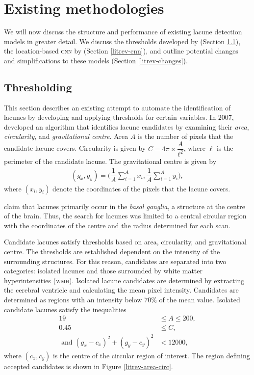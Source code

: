 %
%

\chapter{Existing methodologies}\label{litrev}

We will now discuss the structure and performance of existing lacune detection models in greater detail. We discuss the thresholds developed by \cite{Yokoyama2007} (Section \ref{litrev-threshold}), the location-based \textsc{cnn} by \cite{GhafoorianM.2017Dml3} (Section \ref{litrev-cnn}), and outline potential changes and simplifications to these models (Section \ref{litrev-changes}).

\section{Thresholding}\label{litrev-threshold}

This section describes an existing attempt to automate the identification of lacunes by developing and applying thresholds for certain variables. In 2007, \cite{Yokoyama2007} developed an algorithm that identifies lacune candidates by examining their \textit{area}, \textit{circularity}, and \textit{gravitational centre}. Area $A$ is the number of pixels that the candidate lacune covers. Circularity is given by $C = 4\pi\times\dfrac{A}{\ell^2}$, where $\ell$ is the perimeter of the candidate lacune. The gravitational centre is given by
\begin{align*}
	(g_x, g_y) = \bigg(\dfrac{1}{A}\sum_{i=1}^Ax_i, \dfrac{1}{A}\sum_{i=1}^Ay_i\bigg),
\end{align*}
where $(x_i, y_i)$ denote the coordinates of the pixels that the lacune covers.

\cite{Yokoyama2007} claim that lacunes primarily occur in the \textit{basal ganglia}, a structure at the centre of the brain. Thus, the search for lacunes was limited to a central circular region with the coordinates of the centre and the radius determined for each scan.

Candidate lacunes satisfy thresholds based on area, circularity, and gravitational centre. The thresholds are established dependent on the intensity of the surrounding structures. For this reason, candidates are separated into two categories: isolated lacunes and those surrounded by white matter hyperintensities (\textsc{wmh}). Isolated lacune candidates are determined by extracting the cerebral ventricle and calculating the mean pixel intensity. Candidates are determined as regions with an intensity below 70\% of the mean value. Isolated candidate lacunes satisfy the inequalities
\begin{align*}
	19 & \le A \le 200, \\
	0.45 & \le C,\\
	\text{ and } (g_x - c_x)^2 + (g_y - c_y)^2 & < 12000,
\end{align*}
where $(c_x, c_y)$ is the centre of the circular region of interest. The region defining accepted candidates is shown in Figure \ref{litrev-area-circ}.

